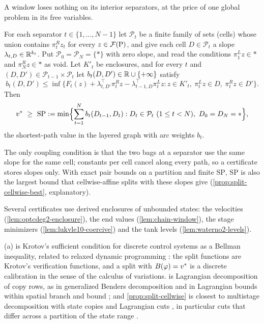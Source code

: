 A window loses nothing on its interior separators, at the price of one global problem in its free variables.

\begin{proposition}\label{prop:split-cellwise}
For each separator $t\in\{1,\dots,N-1\}$ let $\mathcal P_t$ be a finite family of sets (cells) whose union contains $\pi^R_tz_t$ for every $z\in\feas[\mathrm P]$, and give each cell $D\in\mathcal P_t$ a slope $\lambda_{t,D}\in\R^{k_t}$.
Put $\mathcal P_0=\mathcal P_N=\{\ast\}$ with zero slope, and read the conditions $\pi^L_1z\in\ast$ and $\pi^R_Nz\in\ast$ as void.
Let $K'_t$ be enclosures, and for every $t$ and $(D,D')\in\mathcal P_{t-1}\times\mathcal P_t$ let $b_t(D,D')\in\R\cup\{+\infty\}$ satisfy
\[
  b_t(D,D')\le\inf\bigl\{F_t(z)+\lambda_{t,D'}^\top\pi^R_tz-\lambda_{t-1,D}^\top\pi^L_tz :
  z\in K'_t,\ \pi^L_tz\in D,\ \pi^R_tz\in D'\bigr\}.
\]
Then
\[
  \vstar\ \ge\ \mathrm{SP}:=\min\Bigl\{\sum_{t=1}^Nb_t(D_{t-1},D_t) : D_t\in\mathcal P_t\ (1\le t<N),\ D_0=D_N=\ast\Bigr\},
\]
the shortest-path value in the layered graph with arc weights $b_t$.
\end{proposition}

The only coupling condition is that the two bags at a separator use the same slope for the same cell; constants per cell cancel along every path, so a certificate stores slopes only.
With exact pair bounds on a partition and finite $\mathrm{SP}$, $\mathrm{SP}$ is also the largest bound that cellwise-affine splits with these slopes give (\cref{prop:split-cellwise-best}, explanatory).

\begin{remark}\label{rem:split-enclosures}
Several certificates use derived enclosures of unbounded states: the  velocities (\cref{lem:optcdeg2-enclosure}), the  end values (\cref{lem:chain-window}), the  stage minimizers (\cref{lem:lukvle10-coercive}) and the  tank levels (\cref{lem:waterno2-levels}).
\end{remark}

(a) is Krotov's sufficient condition for discrete control systems \citep{krotov1967-sufficient-conditions-for-the-optimality} as a Bellman inequality, related to relaxed dynamic programming \citep{lincoln2006-relaxing-dynamic-programming}: the split functions are Krotov's verification functions, and a split with $B(\varphi)=\vstar$ is a discrete calibration in the sense of the calculus of variations.
 is Lagrangian decomposition of copy rows, as in generalized Benders decomposition \citep{geoffrion1972-generalized-benders-decomposition} and in Lagrangian bounds within spatial branch and bound \citep{karuppiah2008-a-lagrangean-based-branch-and,khajavirad2009-a-deterministic-lagrangian-based-global,cao2019-a-scalable-global-optimization-algorithm}; and \cref{prop:split-cellwise} is closest to multistage decomposition with state copies and Lagrangian cuts \citep{zhang2022-stochastic-dual-dynamic-programming-for,fullner2022-non-convex-nested-benders-decomposition}, in particular cuts that differ across a partition of the state range \citep{yang2025-globally-converging-algorithm-for-multistage}.

